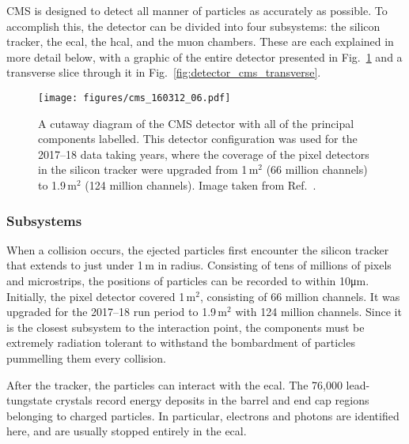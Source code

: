CMS is designed to detect all manner of particles as accurately as possible. To accomplish this, the detector can be divided into four subsystems: the silicon tracker, the \acrfull{ecal}, the \acrfull{hcal}, and the muon chambers. These are each explained in more detail below, with a graphic of the entire detector presented in Fig.~\ref{fig:detector_cms_cutaway} and a transverse slice through it in Fig.~\ref{fig:detector_cms_transverse}.

\begin{figure}[htbp]
    \centering
    \texttt{[image: figures/cms\_160312\_06.pdf]}
    \caption[A cutaway diagram of the CMS detector with all of the principal components labelled. This detector configuration was used for the 2017--18 data taking years]{A cutaway diagram of the CMS detector with all of the principal components labelled. This detector configuration was used for the 2017--18 data taking years, where the coverage of the pixel detectors in the silicon tracker were upgraded from 1\,m$^2$ (66 million channels) to 1.9\,m$^2$ (124 million channels). Image taken from Ref.~.}
    \label{fig:detector_cms_cutaway}
\end{figure}




\subsubsection{Subsystems}
\label{subsubsec:cms_subsystems}

When a collision occurs, the ejected particles first encounter the silicon tracker that extends to just under 1\,m in radius. Consisting of tens of millions of pixels and microstrips, the positions of particles can be recorded to within 10\si{\micro\metre}. Initially, the pixel detector covered 1\,m$^2$, consisting of 66 million channels. It was upgraded for the 2017--18 run period to 1.9\,m$^2$ with 124 million channels. Since it is the closest subsystem to the interaction point, the components must be extremely radiation tolerant to withstand the bombardment of particles pummelling them every collision.

After the tracker, the particles can interact with the \acrshort{ecal}. The 76,000 lead-tungstate crystals record energy deposits in the barrel and end cap regions belonging to charged particles. In particular, electrons and photons are identified here, and are usually stopped entirely in the \acrshort{ecal}. %

